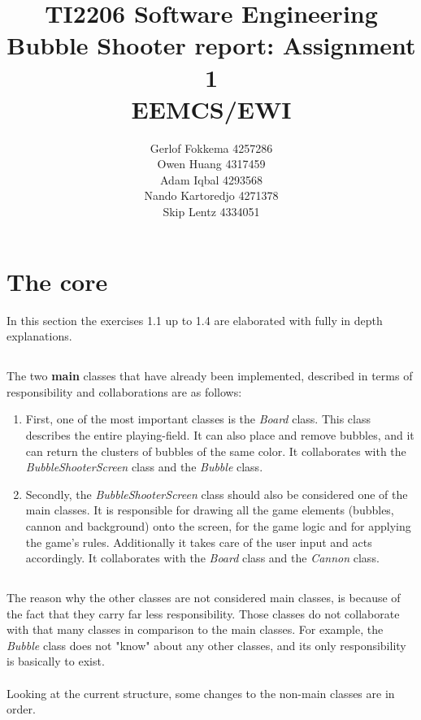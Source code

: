 \documentclass[a4paper,11pt]{article}
\title{TI2206 Software Engineering \\ Bubble Shooter report: Assignment 1 \\ EEMCS/EWI}
\author{Gerlof Fokkema 4257286 \\
	Owen Huang 4317459 \\
	Adam Iqbal 4293568 \\
	Nando Kartoredjo 4271378 \\
	Skip Lentz 4334051 \\
}
\begin{document}
\maketitle
\thispagestyle{empty}

\newpage
\setcounter{page}{1}

\section{The core \\}
In this section the exercises 1.1 up to 1.4 are elaborated with fully in depth explanations. \\

\subsection{}
The two \textbf{main} classes that have already been implemented, described in terms of responsibility and collaborations are as follows:
\begin{enumerate}
  \item First, one of the most important classes is the \textit{Board} class. This class describes the entire playing-field. It can also place and remove bubbles, and it can return the clusters of bubbles of the same color. It collaborates with the \textit{BubbleShooterScreen} class and the \textit{Bubble} class.
  \item Secondly, the \textit{BubbleShooterScreen} class should also be considered one of the main classes. It is responsible for drawing all the game elements (bubbles, cannon and background) onto the screen, for the game logic and for applying the game's rules. Additionally it takes care of the user input and acts accordingly. It collaborates with the \textit{Board} class and the \textit{Cannon} class.
\end{enumerate}

\subsection{}
The reason why the other classes are not considered main classes, is because of the fact that they carry far less responsibility. Those classes do not collaborate with that many classes in comparison to the main classes. For example, the \textit{Bubble} class does not "know" about any other classes, and its only responsibility is basically to exist.\\\\
\noindent
Looking at the current structure, some changes to the non-main classes are in order.
\end{document}
